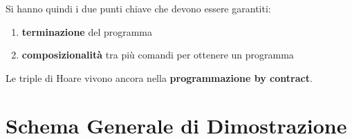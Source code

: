 				      					      			Si hanno quindi i due punti chiave che devono essere garantiti:
				      					      			\begin{enumerate}
				      					      				\item \textbf{terminazione} del programma
				      					      				\item \textbf{composizionalità} tra più comandi per ottenere un programma
				      					      			\end{enumerate}
				      					      			Le triple di Hoare vivono ancora nella \textbf{programmazione by contract}.
				      					      			
				      	    \section{Schema Generale di Dimostrazione}
				      	    